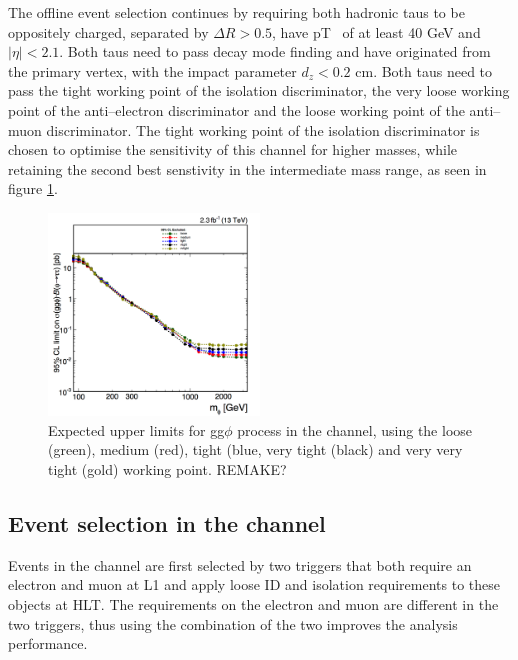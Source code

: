 The offline event selection continues by requiring both hadronic taus to be oppositely charged, separated
by $\Delta R > 0.5$, have pT~ of at least 40 GeV and $|\eta|<2.1$. Both taus need
to pass decay mode finding and have originated from the primary vertex, with the impact parameter $d_{z} < 0.2$ cm. 
Both taus need to pass the tight working point of the isolation discriminator, the very loose 
working point of the anti--electron discriminator and the loose working point of the anti--muon discriminator. 
The tight working point of the isolation discriminator is chosen to optimise the sensitivity
of this channel for higher masses, while retaining the second best senstivity in the intermediate
mass range, as seen in figure \ref{fig:mssm_tauid_tt}.
\begin{figure}[h!]
\begin{center}
\includegraphics[width=0.5\textwidth]{./MSSM/Figures/ggh_tt_isolation.png}
\end{center}
\caption{Expected upper limits for gg$\phi$ process in the \tautau channel, using the 
loose (green), medium (red), tight (blue, very tight (black) and very very tight (gold)
working point. REMAKE?}
\label{fig:mssm_tauid_tt}
\end{figure}

\subsection{\texorpdfstring{Event selection in the \emu channel}{Event selection in the e mu channel}}
\label{sec:mssm_eventsel_em}
Events in the \emu channel are first selected by two triggers
that both require an electron and muon at \ac{L1} and apply loose ID and
isolation requirements to these objects at \ac{HLT}. The \pT requirements on
the electron and muon are different in the two triggers, thus using the combination of the two
improves the analysis performance.

